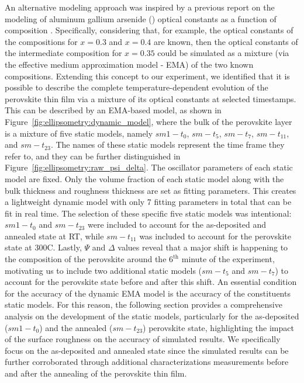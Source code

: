 An alternative modeling approach was inspired by a previous report on the modeling of aluminum gallium arsenide () optical constants as a function of composition \cite{Snyder1990ModelingComposition}. Specifically, considering that, for example, the optical constants of the compositions for $x=0.3$ and $x=0.4$ are known, then the optical constants of the intermediate composition for $x=0.35$ could be simulated as a mixture (via the effective medium approximation model - EMA) of the two known compositions. Extending this concept to our experiment, we identified that it is possible to describe the complete temperature-dependent evolution of the perovskite thin film via a mixture of its optical constants at selected timestamps. This can be described by an EMA-based model, as shown in Figure~\ref{fig:ellipsometry:dynamic_model}, where the bulk of the perovskite layer is a mixture of five static models, namely $sm1-t_0$, $sm-t_5$, $sm-t_7$, $sm-t_{\text{11}}$, and $sm-t_{\text{23}}$. The names of these static models represent the time frame they refer to, and they can be further distinguished in Figure~\ref{fig:ellipsometry:raw_psi_delta}. The oscillator parameters of each static model are fixed. Only the volume fraction of each static model along with the bulk thickness and roughness thickness are set as fitting parameters. This creates a lightweight dynamic model with only 7 fitting parameters in total that can be fit in real time. The selection of these specific five static models was intentional: $sm1-t_0$ and $sm-t_{\text{23}}$ were included to account for the as-deposited and annealed state at RT, while $sm-t_{\text{11}}$ was included to account for the perovskite state at 300\degree C. Lastly, $\Psi$ and $\Delta$ values reveal that a major shift is happening to the composition of the perovskite around the $6^{\text{th}}$ minute of the experiment, motivating us to include two additional static models ($sm-t_5$ and $sm-t_7$) to account for the perovskite state before and after this shift. An essential condition for the accuracy of the dynamic EMA model is the accuracy of the constituents static models. For this reason, the following section provides a comprehensive analysis on the development of the static models, particularly for the as-deposited ($sm1-t_0$) and the annealed ($sm-t_{\text{23}}$) perovskite state, highlighting the impact of the surface roughness on the accuracy of simulated results. We specifically focus on the as-deposited and annealed state since the simulated results can be further corroborated through additional characterizations measurements before and after the annealing of the perovskite thin film. 

